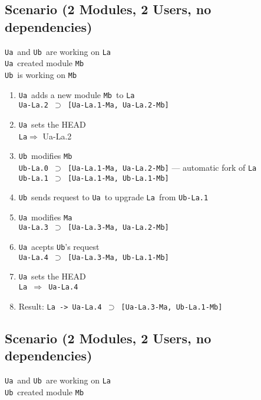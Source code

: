 \documentclass[10pt]{article}
\def\Ua{{\tt Ua}}
\def\Ub{{\tt Ub}}
\def\La{{\tt La}}
\def\Ma{{\tt Ma}}
\def\Mb{{\tt Mb}}
\def\headsto{${\Longrightarrow}$ }
\def\hto{\headsto}
\def\eq{${\supset}$ }
\begin{document}
	\subsection{Scenario (2 Modules, 2 Users, no dependencies)}

		\Ua\ and \Ub\ are working on \La\\ 
		\Ua\ created module \Mb\\
		\Ub\ is working on \Mb\
		
		\begin{enumerate}
			\item{\Ua\ adds a new module \Mb\ to \La\\
				{\tt Ua-La.2 \eq [Ua-La.1-Ma, Ua-La.2-Mb]}
			}
			\item{\Ua\ sets the HEAD\\
				{\La \hto Ua-La.2}
			}
			\item{\Ub\ modifies \Mb\\				
				{\tt Ub-La.0 \eq [Ua-La.1-Ma, Ua-La.2-Mb]} --- automatic fork of \La\\
				{\tt Ub-La.1 \eq [Ua-La.1-Ma, Ub-La.1-Mb]}
			}
			\item{\Ub\ sends request to \Ua\ to upgrade \La\ from {\tt Ub-La.1}}
			\item{\Ua\ modifies \Ma\\
				{\tt Ua-La.3 \eq [Ua-La.3-Ma, Ua-La.2-Mb]}
			}
			\item{\Ua\ acepts \Ub's request\\
				{\tt Ua-La.4 \eq [Ua-La.3-Ma, Ub-La.1-Mb]}
			}
			\item{\Ua\ sets the HEAD\\
				{\tt La \hto Ua-La.4}
			}
			\item{Result: {\tt La -> Ua-La.4 \eq [Ua-La.3-Ma, Ub-La.1-Mb]}}
		\end{enumerate}

	\subsection{Scenario (2 Modules, 2 Users, no dependencies)}
	
		\Ua\ and \Ub\ are working on \La\\ 
		\Ub\ created module \Mb\
		
\end{document}
